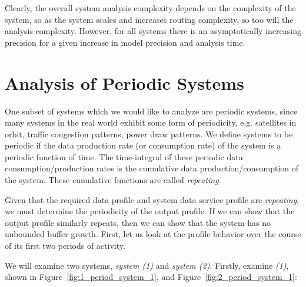 Clearly, the overall system analysis complexity depends on the
complexity of the system, so as the system scales and increases
routing complexity, so too will the analysis complexity.  However, for
all systems there is an asymptotically increasing precision for a
given increase in model precision and analysis time.

\newpage

\section{Analysis of Periodic Systems}
\label{sec:periodic}

One subset of systems which we would like to analyze are periodic
systems, since many systems in the real world exhibit some form of
periodicity, e.g. satellites in orbit, traffic congestion patterns,
power draw patterns.  We define systems to be periodic if the data
production rate (or consumption rate) of the system is a periodic
function of time.  The time-integral of these periodic data
consumption/production rates is the cumulative data
production/consumption of the system.  These cumulative functions are
called \emph{repeating}.

Given that the required data profile and system data service profile
are \emph{repeating}, we must determine the periodicity of the output
profile.  If we can show that the output profile similarly repeats,
then we can show that the system has no unbounded buffer growth.
First, let us look at the profile behavior over the course of its
first two periods of activity.

We will examine two systems, \emph{system (1)} and \emph{system (2)}.
Firstly, examine \emph{(1)}, shown in
Figure~\ref{fig:1_period_system_1}, and
Figure~\ref{fig:2_period_system_1}:


